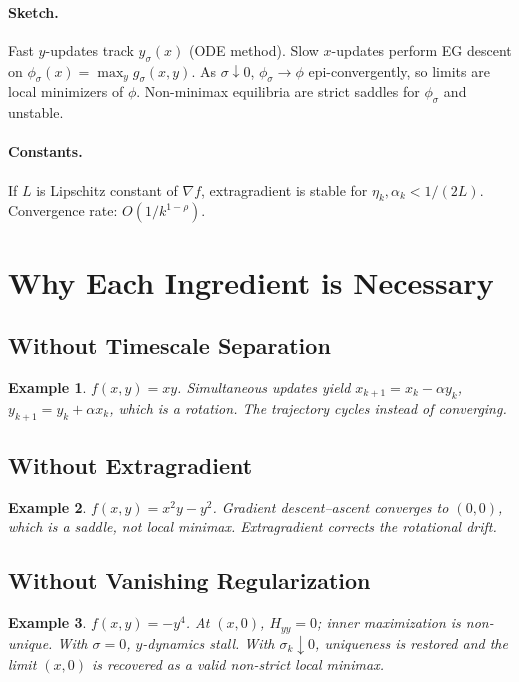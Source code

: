 \documentclass[11pt]{article}
\newtheorem{example}{Example}
\begin{document}
\paragraph{Sketch.}
Fast $y$-updates track $y_\sigma(x)$ (ODE method). Slow $x$-updates perform EG descent on $\phi_\sigma(x)=\max_y g_\sigma(x,y)$. As $\sigma\downarrow 0$, $\phi_\sigma\to \phi$ epi-convergently, so limits are local minimizers of $\phi$. Non-minimax equilibria are strict saddles for $\phi_\sigma$ and unstable.

\paragraph{Constants.}
If $L$ is Lipschitz constant of $\nabla f$, extragradient is stable for $\eta_k,\alpha_k < 1/(2L)$. Convergence rate: $O(1/k^{1-\rho})$.

\section{Why Each Ingredient is Necessary}

\subsection{Without Timescale Separation}
\begin{example}
$f(x,y)=xy$. Simultaneous updates yield
$x_{k+1}=x_k-\alpha y_k$, $y_{k+1}=y_k+\alpha x_k$,
which is a rotation. The trajectory cycles instead of converging.
\end{example}

\subsection{Without Extragradient}
\begin{example}
$f(x,y)=x^2y-y^2$. Gradient descent--ascent converges to $(0,0)$,
which is a saddle, not local minimax. Extragradient corrects the rotational drift.
\end{example}

\subsection{Without Vanishing Regularization}
\begin{example}
$f(x,y)=-y^4$. At $(x,0)$, $H_{yy}=0$; inner maximization is non-unique.
With $\sigma=0$, $y$-dynamics stall. With $\sigma_k\downarrow 0$, uniqueness is restored and the limit $(x,0)$ is recovered as a valid non-strict local minimax.
\end{example}
\end{document}
